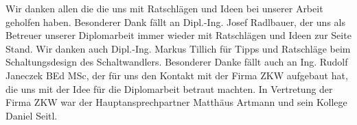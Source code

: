 \begin{acknowledgements}
	\begin{center}
    Wir danken allen die die uns mit Ratschlägen und Ideen bei unserer Arbeit geholfen haben. Besonderer Dank fällt an Dipl.-Ing. Josef Radlbauer, der uns als Betreuer unserer Diplomarbeit immer wieder mit Ratschlägen und Ideen zur Seite Stand. Wir danken auch Dipl.-Ing. Markus Tillich für Tipps und Ratschläge beim Schaltungsdesign des Schaltwandlers. Besonderer Danke fällt auch an Ing. Rudolf Janeczek BEd MSc, der für uns den Kontakt mit der Firma ZKW aufgebaut hat, die uns mit der Idee für die Diplomarbeit betraut machten. In Vertretung der Firma ZKW war der Hauptansprechpartner Matthäus Artmann und sein Kollege Daniel Seitl. 
	\end{center}
\end{acknowledgements}
